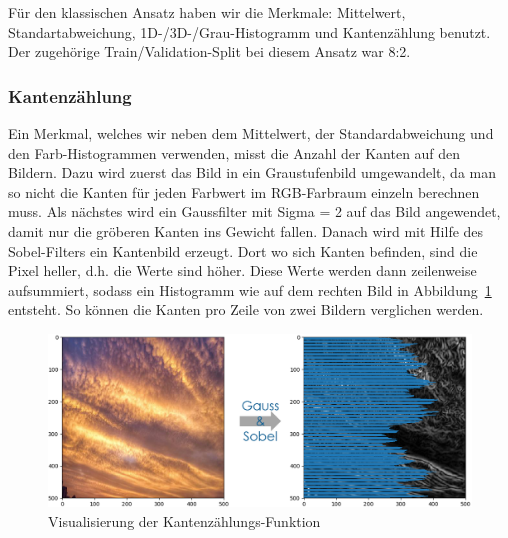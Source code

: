 \documentclass[a4,german]{article}
\begin{document}

Für den klassischen Ansatz haben wir die Merkmale: Mittelwert, Standartabweichung, 1D-/3D-/Grau-Histogramm und Kantenzählung benutzt. 
Der zugehörige Train/Validation-Split bei diesem Ansatz war 8:2.

\subsubsection{Kantenzählung}
\label{sec:kanten}
Ein Merkmal, welches wir neben dem Mittelwert, der Standardabweichung und den Farb-Histogrammen verwenden, misst die Anzahl der Kanten auf den Bildern.
Dazu wird zuerst das Bild in ein Graustufenbild umgewandelt, da man so nicht die Kanten für jeden Farbwert im RGB-Farbraum einzeln berechnen muss. Als nächstes wird ein Gaussfilter mit Sigma = 2 auf das Bild angewendet, damit nur die gröberen Kanten ins Gewicht fallen. Danach wird mit Hilfe des Sobel-Filters ein Kantenbild erzeugt.
Dort wo sich Kanten befinden, sind die Pixel heller, d.h. die Werte sind höher.
Diese Werte werden dann zeilenweise aufsummiert, sodass ein Histogramm wie auf dem rechten Bild in Abbildung~\ref{fig:kaz} entsteht. So können die Kanten pro Zeile von zwei Bildern verglichen werden.

\begin{figure}[h!]
\centering
\includegraphics[width=\textwidth]{Kantenzaehlung.png}
\caption{Visualisierung der Kantenzählungs-Funktion}
    \label{fig:kaz}
\end{figure}
\end{document}
